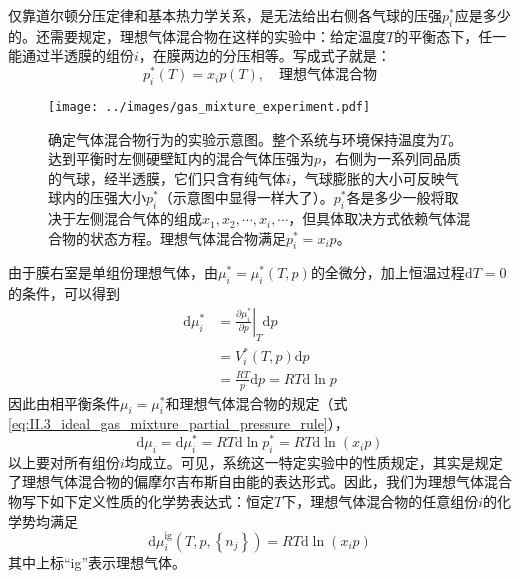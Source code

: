 \documentclass[main.tex]{subfiles}
\begin{document}
仅靠道尔顿分压定律和基本热力学关系，是无法给出右侧各气球的压强$p^*_i$应是多少的。还需要规定，理想气体混合物在这样的实验中：给定温度$T$的平衡态下，任一能通过半透膜的组份$i$，在膜两边的分压相等。写成式子就是：
\begin{equation}
    \label{eq:II.3_ideal_gas_mixture_partial_pressure_rule}
    p^*_i\left(T\right)=x_ip\left(T\right),\quad\text{理想气体混合物}
\end{equation}

\begin{figure}[ht]
    \centering
    \texttt{[image: ../images/gas\_mixture\_experiment.pdf]}
    \caption{确定气体混合物行为的实验示意图。整个系统与环境保持温度为$T$。达到平衡时左侧硬壁缸内的混合气体压强为$p$，右侧为一系列同品质的气球，经半透膜，它们只含有纯气体$i$，气球膨胀的大小可反映气球内的压强大小$p^*_i$（示意图中显得一样大了）。$p^*_i$各是多少一般将取决于左侧混合气体的组成$x_1,x_2,\cdots,x_i,\cdots$，但具体取决方式依赖气体混合物的状态方程。理想气体混合物满足$p^*_i=x_ip$。}
    \label{fig:gas_mixture_experiment}
\end{figure}

由于膜右室是单组份理想气体，由$\mu_i^*=\mu_i^*\left(T,p\right)$的全微分，加上恒温过程$\mathrm{d}T=0$的条件，可以得到
\begin{align*}
    \mathrm{d}\mu_i^* & =\left.\frac{\partial\mu_i^*}{\partial p}\right|_{T}\mathrm{d}p \\
                      & =V_i^*\left(T,p\right)\mathrm{d}p                               \\
                      & =\frac{RT}{p}\mathrm{d}p=RT\mathrm{d}\ln p
\end{align*}
因此由相平衡条件$\mu_i=\mu_i^*$和理想气体混合物的规定（式\eqref{eq:II.3_ideal_gas_mixture_partial_pressure_rule}），
\[\mathrm{d}\mu_i=\mathrm{d}\mu_i^*=RT\mathrm{d}\ln p_i^*=RT\mathrm{d}\ln\left(x_ip\right)\]
以上要对所有组份$i$均成立。可见，系统这一特定实验中的性质规定，其实是规定了理想气体混合物的偏摩尔吉布斯自由能的表达形式。因此，我们为理想气体混合物写下如下定义性质的化学势表达式：恒定$T$下，理想气体混合物的任意组份$i$的化学势均满足
\begin{equation}\label{eq:II.3_def_ideal_gas_mixture_mu}
    \mathrm{d}\mu_i^\text{ig}\left(T,p,\left\{n_j\right\}\right)=RT\mathrm{d}\ln\left(x_i p\right)
\end{equation}
其中上标“ig”表示理想气体。
\end{document}
